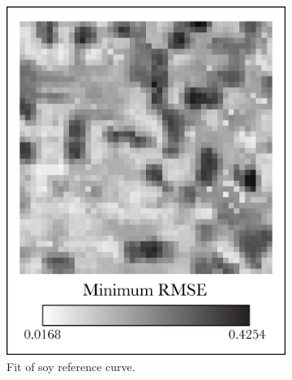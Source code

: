 \begin{figure}
\begin{subfigure}[b]{.45\textwidth}
    \includegraphics[width=\textwidth]{Graphics/soy1_edited.png}
    \caption{Fit of soy reference curve.}
    \label{subfig:soy1}
  \end{subfigure}
  \\
  \vspace{.25in}
  \begin{subfigure}[b]{.45\textwidth}

\end{subfigure}
\end{figure}
